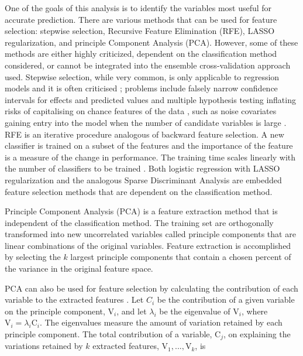 \documentclass[12pt,]{article}
\begin{document}
One of the goals of this analysis is to identify the variables most
useful for accurate prediction. There are various methods that can be
used for feature selection: stepwise selection, Recursive Feature
Elimination (RFE), LASSO regularization, and principle Component
Analysis (PCA). However, some of these methods are either highly
criticized, dependent on the classification method considered, or cannot
be integrated into the ensemble cross-validation approach used. Stepwise
selection, while very common, is only applicable to regression models
and it is often criticised \autocite{kemp_applied_2003}; problems
include falsely narrow confidence intervals for effects and predicted
values \autocite{altman_bootstrap_1989} and multiple hypothesis testing
inflating risks of capitalising on chance features of the data
\autocite{altman_practical_1991}, such as noise covariates gaining entry
into the model when the number of candidate variables is large
\autocite{derksen_backward_1992}. RFE is an iterative procedure
analogous of backward feature selection. A new classifier is trained on
a subset of the features and the importance of the feature is a measure
of the change in performance. The training time scales linearly with the
number of classifiers to be trained \autocite{guyon_gene_2002}. Both
logistic regression with LASSO regularization
\autocite{tibshirani_regression_1996} and the analogous Sparse
Discriminant Analysis \autocite{clemmensen_sparse_2011} are embedded
feature selection methods that are dependent on the classification
method.

Principle Component Analysis (PCA) \autocite{f.r.s_liii._1901} is a
feature extraction method that is independent of the classification
method. The training set are orthogonally transformed into new
uncorrelated variables called principle components that are linear
combinations of the original variables. Feature extraction is
accomplished by selecting the \(k\) largest principle components that
contain a chosen percent of the variance in the original feature space.

PCA can also be used for feature selection by calculating the
contribution of each variable to the extracted features
\autocite{song_feature_2010}. Let \(C_i\) be the contribution of a given
variable on the principle component, \(\text{V}_i\), and let
\(\lambda_i\) be the eigenvalue of \(\text{V}_i\), where
\(\text{V}_{i} = \lambda_i \text{C}_i\). The eigenvalues measure the
amount of variation retained by each principle component. The total
contribution of a variable, \(\text{C}_j\), on explaining the variations
retained by \(k\) extracted features, \(\text{V}_1, ..., \text{V}_k\),
is
\end{document}
